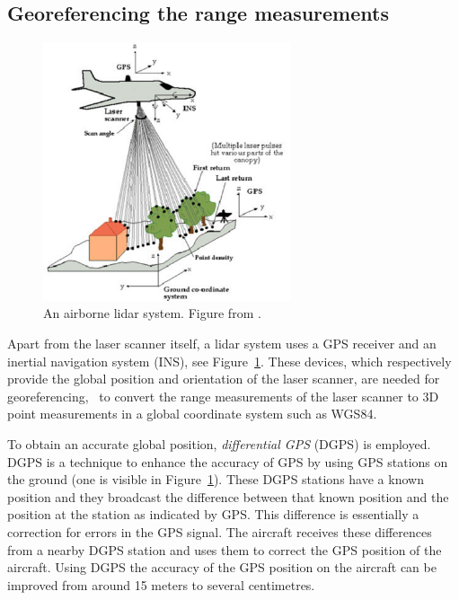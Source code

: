 %
\subsection{Georeferencing the range measurements}

\begin{figure}
	\centering
	\includegraphics[width=0.65\textwidth]{figs/lidar-gnss-imu.png}
	\caption{An airborne lidar system. Figure from \citet{Dowman04}.}%
\label{fig:airborne-lidar}
\end{figure}
Apart from the  laser scanner itself, a lidar  system uses a GPS receiver and an inertial navigation system (INS), see Figure~\ref{fig:airborne-lidar}. 
These devices, which respectively provide the global position and orientation of the laser scanner, are needed for georeferencing, \ie\ to convert the range measurements of the laser scanner to 3D point measurements in a global coordinate system such as WGS84. 

To  obtain an accurate global position, \emph{differential GPS} (DGPS) is employed. 
DGPS is a technique to enhance the accuracy of GPS  by using GPS stations on the ground (one is visible in Figure~\ref{fig:airborne-lidar}). 
These DGPS stations have a known position and they broadcast the difference between that  known position and the position at the station as indicated by GPS\@. 
This difference is essentially a correction for errors in the GPS signal. The aircraft receives these differences from a nearby DGPS station and uses them to correct the GPS position of the aircraft. Using DGPS the accuracy of the GPS position on the aircraft can be improved from around 15 meters to several centimetres.

